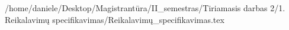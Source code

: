 /home/daniele/Desktop/Magistrantūra/II_semestras/Tiriamasis darbas 2/1. Reikalavimų specifikavimas/Reikalavimų_specifikavimas.tex